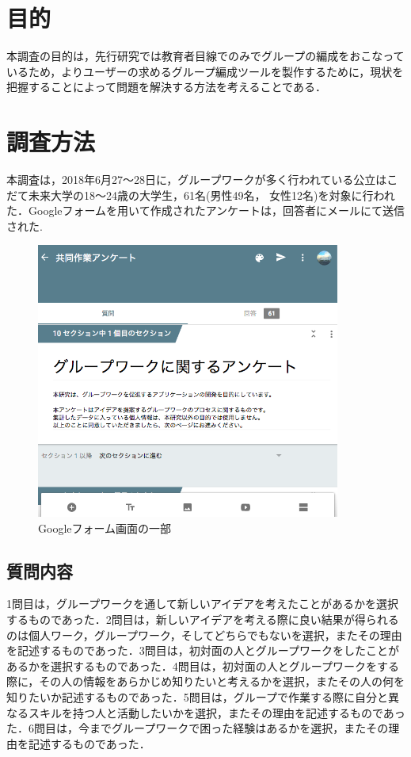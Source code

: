 \documentclass{funthesis}
\begin{document}
\section{目的}

本調査の目的は，先行研究では教育者目線でのみでグループの編成をおこなっているため，よりユーザーの求めるグループ編成ツールを製作するために，現状を把握することによって問題を解決する方法を考えることである．

\section{調査方法}

本調査は，2018年6月27〜28日に，グループワークが多く行われている公立はこだて未来大学の18〜24歳の大学生，61名(男性49名， 女性12名)を対象に行われた．Googleフォームを用いて作成されたアンケートは，回答者にメールにて送信された.
\begin{figure}[H]
 \centering
   \includegraphics[width=100mm]{figures/groupwork1.png}
 \caption{Googleフォーム画面の一部}
 \label{fig:model}
\end{figure}


\subsection{質問内容}

1問目は，グループワークを通して新しいアイデアを考えたことがあるかを選択するものであった．2問目は，新しいアイデアを考える際に良い結果が得られるのは個人ワーク，グループワーク，そしてどちらでもないを選択，またその理由を記述するものであった．3問目は，初対面の人とグループワークをしたことがあるかを選択するものであった．4問目は，初対面の人とグループワークをする際に，その人の情報をあらかじめ知りたいと考えるかを選択，またその人の何を知りたいか記述するものであった．5問目は，グループで作業する際に自分と異なるスキルを持つ人と活動したいかを選択，またその理由を記述するものであった．6問目は，今までグループワークで困った経験はあるかを選択，またその理由を記述するものであった．
\end{document}
